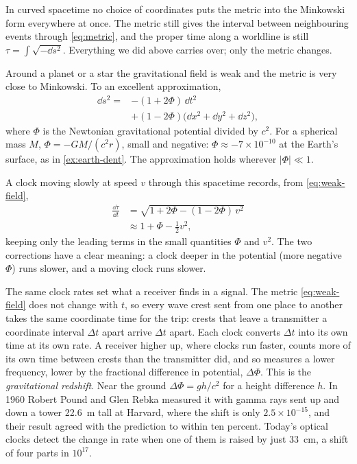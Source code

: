 In curved spacetime no choice of coordinates puts the metric into the
Minkowski form everywhere at once. The metric still gives the interval between
neighbouring events through \cref{eq:metric}, and the proper time along a
worldline is still $\tau = \int\sqrt{-\dd s^{2}}$. Everything we did above
carries over; only the metric changes.

Around a planet or a star the gravitational field is weak and the metric is
very close to Minkowski. To an excellent approximation,
\begin{equation}
  \begin{split}
  \dd s^{2} = {}&-(1 + 2\Phi)\,\dd t^{2}\\
  &+ (1 - 2\Phi)\bigl(\dd x^{2} + \dd y^{2} + \dd z^{2}\bigr),
  \end{split}
  \label{eq:weak-field}
\end{equation}
where $\Phi$ is the Newtonian gravitational potential divided by $c^{2}$. For a
spherical mass $M$, $\Phi = -GM/(c^{2}r)$, small and negative:
$\Phi \approx -7\times10^{-10}$ at the Earth's surface, as in
\cref{ex:earth-dent}. The approximation holds wherever $|\Phi| \ll 1$.

A clock moving slowly at speed $v$ through this spacetime records, from
\cref{eq:weak-field},
\begin{equation}
  \begin{split}
  \frac{\dd\tau}{\dd t} &= \sqrt{1 + 2\Phi - (1 - 2\Phi)\,v^{2}}\\
  &\approx 1 + \Phi - \tfrac{1}{2}v^{2},
  \end{split}
  \label{eq:clock-rate}
\end{equation}
keeping only the leading terms in the small quantities $\Phi$ and $v^{2}$. The
two corrections have a clear meaning: a clock deeper in the potential (more
negative $\Phi$) runs slower, and a moving clock runs slower.

The same clock rates set what a receiver finds in a signal. The metric
\cref{eq:weak-field} does not change with $t$, so every wave crest sent from
one place to another takes the same coordinate time for the trip: crests that
leave a transmitter a coordinate interval $\Delta t$ apart arrive $\Delta t$
apart. Each clock converts $\Delta t$ into its own time at its own rate. A
receiver higher up, where clocks run faster, counts more of its own time
between crests than the transmitter did, and so measures a lower frequency,
lower by the fractional difference in potential, $\Delta\Phi$. This is the
\emph{gravitational redshift}. Near the ground $\Delta\Phi = gh/c^{2}$ for a
height difference $h$. In 1960 Robert Pound and Glen Rebka measured it with
gamma rays sent up and down a tower \SI{22.6}{\metre} tall at Harvard, where the
shift is only $2.5\times10^{-15}$, and their result agreed with the prediction
to within ten percent. Today's optical clocks detect the change in rate when
one of them is raised by just \SI{33}{\centi\metre}, a shift of four parts in
$10^{17}$.

